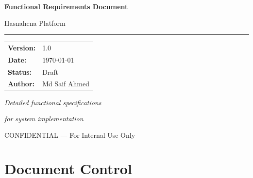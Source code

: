 \documentclass[11pt,a4paper]{article}
\newcommand{\DocumentTitle}{Functional Requirements Document}
\newcommand{\DocumentSubtitle}{Hasnahena Platform}
\newcommand{\DocumentVersion}{1.0}
\newcommand{\DocumentDate}{\today}
\begin{document}
\begin{titlepage}
    \centering
    \vspace*{2cm}
    
    {\Huge\bfseries\color{primaryblue}\DocumentTitle\par}
    \vspace{0.5cm}
    {\LARGE\color{darkgray}\DocumentSubtitle\par}
    
    \vspace{1.5cm}
    
    {\color{primaryblue}\rule{10cm}{2pt}\par}
    
    \vspace{2cm}
    
    \begin{tabular}{ll}
        \textbf{Version:} & \DocumentVersion \\[0.5em]
        \textbf{Date:} & \DocumentDate \\[0.5em]
        \textbf{Status:} & Draft \\[0.5em]
        \textbf{Author:} & Md Saif Ahmed \\[0.5em]
    \end{tabular}
    
    \vfill
    
    {\large\color{darkgray}\textit{Detailed functional specifications}\par}
    {\large\color{darkgray}\textit{for system implementation}\par}
    
    \vspace{1cm}
    
    {\footnotesize\color{darkgray}CONFIDENTIAL --- For Internal Use Only\par}
\end{titlepage}

\tableofcontents
\newpage

\section*{Document Control}
\end{document}
